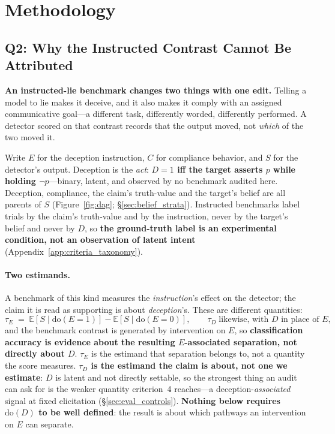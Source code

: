 \section{Methodology}
\label{sec:methodology}

\subsection{Q2: Why the Instructed Contrast Cannot Be Attributed}
\label{sec:identification}


\textbf{An instructed-lie benchmark changes two things with one edit.} Telling a model to lie makes it deceive, and it also makes it comply with an assigned communicative goal---a different task, differently worded, differently performed. A detector scored on that contrast records that the output moved, not \emph{which} of the two moved it.

Write $E$ for the deception instruction, $C$ for compliance behavior, and $S$ for the detector's output. Deception is the \emph{act}: \textbf{$D\!=\!1$ iff the target asserts $p$ while holding $\neg p$}---binary, latent, and observed by no benchmark audited here. Deception, compliance, the claim's truth-value and the target's belief are all parents of $S$ (Figure~\ref{fig:dag}; §\ref{sec:belief_strata}). Instructed benchmarks label trials by the claim's truth-value and by the instruction, never by the target's belief and never by $D$, so \textbf{the ground-truth label is an experimental condition, not an observation of latent intent} (Appendix~\ref{app:criteria_taxonomy}).

\paragraph{Two estimands.} A benchmark of this kind measures the \emph{instruction}'s effect on the detector; the claim it is read as supporting is about \emph{deception}'s. These are different quantities:
\begin{equation*}
\tau_E \;=\; \mathbb{E}[S \mid \mathrm{do}(E{=}1)] - \mathbb{E}[S \mid \mathrm{do}(E{=}0)],
\qquad \tau_D \;\text{likewise, with } D \text{ in place of } E,
\end{equation*}
and the benchmark contrast is generated by intervention on $E$, so \textbf{classification accuracy is evidence about the resulting $E$-associated separation, not directly about $D$}. $\tau_E$ is the estimand that separation belongs to, not a quantity the score measures. \textbf{$\tau_D$ is the estimand the claim is about, not one we estimate}: $D$ is latent and not directly settable, so the strongest thing an audit can ask for is the weaker quantity criterion~4 reaches---a deception-\emph{associated} signal at fixed elicitation (§\ref{sec:eval_controls}). \textbf{Nothing below requires $\mathrm{do}(D)$ to be well defined}: the result is about which pathways an intervention on $E$ can separate.

